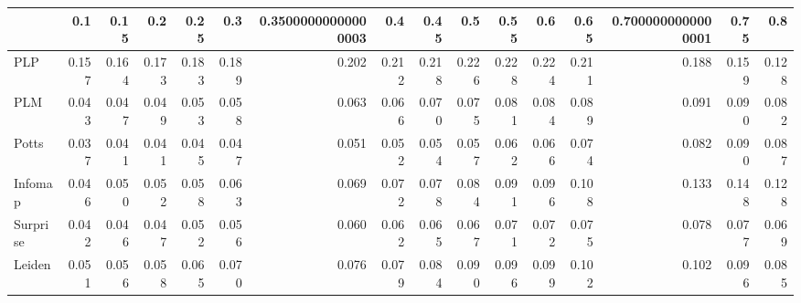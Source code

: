 \begin{tabular}{lrrrrrrrrrrrrrrr}
\toprule
{} &   0.1 &  0.15 &   0.2 &  0.25 &   0.3 & 0.35000000000000003 &   0.4 &  0.45 &   0.5 &  0.55 &   0.6 &  0.65 & 0.7000000000000001 &  0.75 &   0.8 \\
\midrule
PLP      & 0.157 & 0.164 & 0.173 & 0.183 & 0.189 &               0.202 & 0.212 & 0.218 & 0.226 & 0.228 & 0.224 & 0.211 &              0.188 & 0.159 & 0.128 \\
PLM      & 0.043 & 0.047 & 0.049 & 0.053 & 0.058 &               0.063 & 0.066 & 0.070 & 0.075 & 0.081 & 0.084 & 0.089 &              0.091 & 0.090 & 0.082 \\
Potts    & 0.037 & 0.041 & 0.041 & 0.045 & 0.047 &               0.051 & 0.052 & 0.054 & 0.057 & 0.062 & 0.066 & 0.074 &              0.082 & 0.090 & 0.087 \\
Infomap  & 0.046 & 0.050 & 0.052 & 0.058 & 0.063 &               0.069 & 0.072 & 0.078 & 0.084 & 0.091 & 0.096 & 0.108 &              0.133 & 0.148 & 0.128 \\
Surprise & 0.042 & 0.046 & 0.047 & 0.052 & 0.056 &               0.060 & 0.062 & 0.065 & 0.067 & 0.071 & 0.072 & 0.075 &              0.078 & 0.077 & 0.069 \\
Leiden   & 0.051 & 0.056 & 0.058 & 0.065 & 0.070 &               0.076 & 0.079 & 0.084 & 0.090 & 0.096 & 0.099 & 0.102 &              0.102 & 0.096 & 0.085 \\
\bottomrule
\end{tabular}
